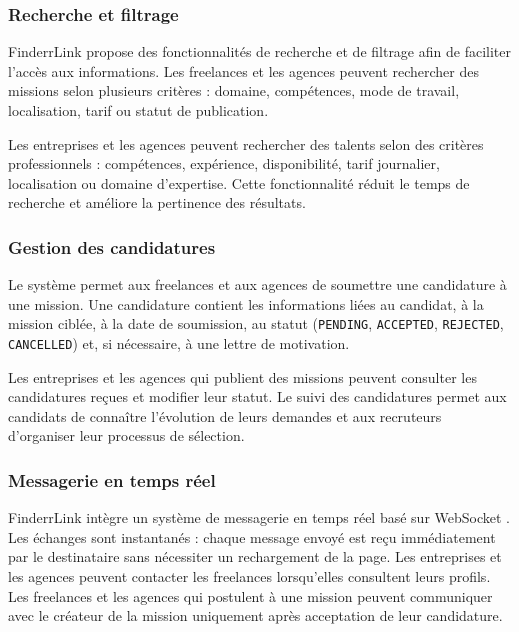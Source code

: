 \subsubsection{Recherche et filtrage}

FinderrLink propose des fonctionnalités de recherche et de filtrage afin de faciliter l'accès aux informations. Les freelances et les agences peuvent rechercher des missions selon plusieurs critères : domaine, compétences, mode de travail, localisation, tarif ou statut de publication.

Les entreprises et les agences peuvent rechercher des talents selon des critères professionnels : compétences, expérience, disponibilité, tarif journalier, localisation ou domaine d'expertise. Cette fonctionnalité réduit le temps de recherche et améliore la pertinence des résultats.

\subsubsection{Gestion des candidatures}

Le système permet aux freelances et aux agences de soumettre une candidature à une mission. Une candidature contient les informations liées au candidat, à la mission ciblée, à la date de soumission, au statut (\texttt{PENDING}, \texttt{ACCEPTED}, \texttt{REJECTED}, \texttt{CANCELLED}) et, si nécessaire, à une lettre de motivation.

Les entreprises et les agences qui publient des missions peuvent consulter les candidatures reçues et modifier leur statut. Le suivi des candidatures permet aux candidats de connaître l'évolution de leurs demandes et aux recruteurs d'organiser leur processus de sélection.

\subsubsection{Messagerie en temps réel}

FinderrLink intègre un système de messagerie en temps réel basé sur WebSocket \cite{socketio}. Les échanges sont instantanés : chaque message envoyé est reçu immédiatement par le destinataire sans nécessiter un rechargement de la page. Les entreprises et les agences peuvent contacter les freelances lorsqu'elles consultent leurs profils. Les freelances et les agences qui postulent à une mission peuvent communiquer avec le créateur de la mission uniquement après acceptation de leur candidature.

